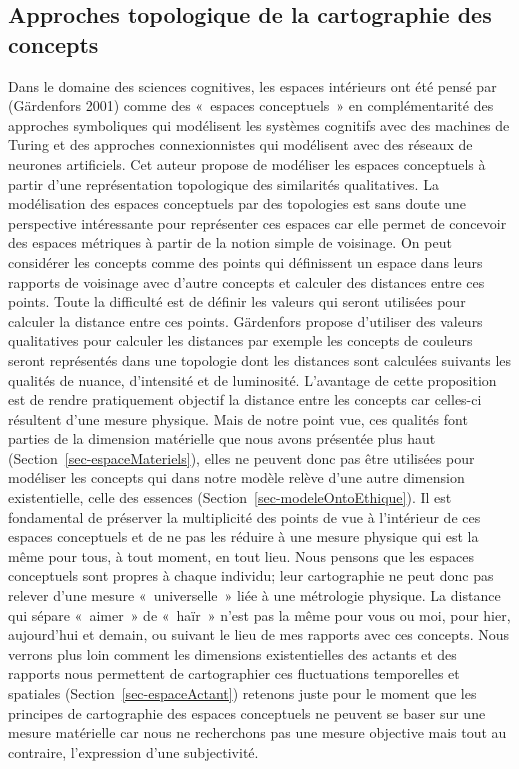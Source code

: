 \documentclass[
  letterpaper,
  DIV=11,
  numbers=noendperiod]{scrreprt}
\begin{document}
\hypertarget{sec-approcheTopologique}{%
\subsection{Approches topologique de la cartographie des
concepts}\label{sec-approcheTopologique}}

Dans le domaine des sciences cognitives, les espaces intérieurs ont été
pensé par (Gärdenfors 2001) comme des «~espaces conceptuels~» en
complémentarité des approches symboliques qui modélisent les systèmes
cognitifs avec des machines de Turing et des approches connexionnistes
qui modélisent avec des réseaux de neurones artificiels. Cet auteur
propose de modéliser les espaces conceptuels à partir d'une
représentation topologique des similarités qualitatives. La modélisation
des espaces conceptuels par des topologies est sans doute une
perspective intéressante pour représenter ces espaces car elle permet de
concevoir des espaces métriques à partir de la notion simple de
voisinage. On peut considérer les concepts comme des points qui
définissent un espace dans leurs rapports de voisinage avec d'autre
concepts et calculer des distances entre ces points. Toute la difficulté
est de définir les valeurs qui seront utilisées pour calculer la
distance entre ces points. Gärdenfors propose d'utiliser des valeurs
qualitatives pour calculer les distances par exemple les concepts de
couleurs seront représentés dans une topologie dont les distances sont
calculées suivants les qualités de nuance, d'intensité et de luminosité.
L'avantage de cette proposition est de rendre pratiquement objectif la
distance entre les concepts car celles-ci résultent d'une mesure
physique. Mais de notre point vue, ces qualités font parties de la
dimension matérielle que nous avons présentée plus haut
(Section~\ref{sec-espaceMateriels}), elles ne peuvent donc pas être
utilisées pour modéliser les concepts qui dans notre modèle relève d'une
autre dimension existentielle, celle des essences
(Section~\ref{sec-modeleOntoEthique}). Il est fondamental de préserver
la multiplicité des points de vue à l'intérieur de ces espaces
conceptuels et de ne pas les réduire à une mesure physique qui est la
même pour tous, à tout moment, en tout lieu. Nous pensons que les
espaces conceptuels sont propres à chaque individu; leur cartographie ne
peut donc pas relever d'une mesure «~universelle~» liée à une métrologie
physique. La distance qui sépare «~aimer~» de «~haïr~» n'est pas la même
pour vous ou moi, pour hier, aujourd'hui et demain, ou suivant le lieu
de mes rapports avec ces concepts. Nous verrons plus loin comment les
dimensions existentielles des actants et des rapports nous permettent de
cartographier ces fluctuations temporelles et spatiales
(Section~\ref{sec-espaceActant}) retenons juste pour le moment que les
principes de cartographie des espaces conceptuels ne peuvent se baser
sur une mesure matérielle car nous ne recherchons pas une mesure
objective mais tout au contraire, l'expression d'une subjectivité.
\end{document}
